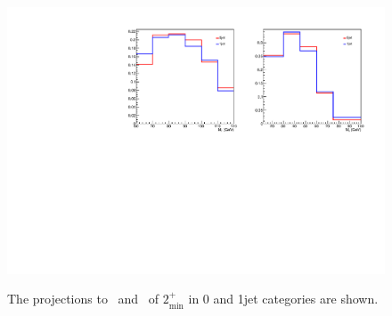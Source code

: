 \begin{figure}[!hbtp]
\centering
\includegraphics[width=.90\textwidth]{figures/spin2_mT_mll.pdf}
\label{fig:mt_mll_projecttion_sig}
\caption{ The projections to \mt~and \mll~of $2_\text{min}^+$ in 0 and 1jet 
categories are shown.}
\end{figure}

